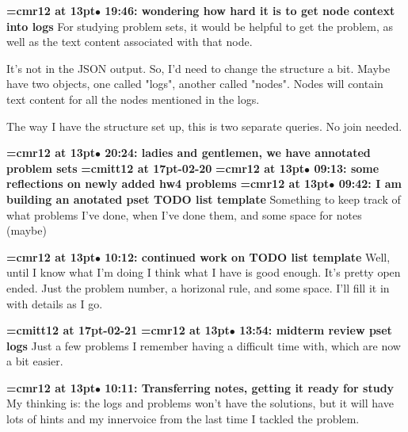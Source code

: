 {\smallskip\noindent\bf\font\titlefont=cmr12 at 13pt\titlefont $\bullet$ 19:46: wondering how hard it is to get node context into logs}\smallskip
For studying problem sets, it would be helpful to get the problem, as well as the text content associated with that node.
\par

It's not in the JSON output. So, I'd need to change the structure a bit. Maybe have two objects, one called "logs", another called "nodes". Nodes will contain text content for all the nodes mentioned in the logs.
\par

The way I have the structure set up, this is two separate queries. No join needed.
\par

{\smallskip\noindent\bf\font\titlefont=cmr12 at 13pt\titlefont $\bullet$ 20:24: ladies and gentlemen, we have annotated problem sets}\smallskip
{\medskip\noindent\bf\font\titlefont=cmitt12 at 17pt-02-20}\medskip
{\smallskip\noindent\bf\font\titlefont=cmr12 at 13pt\titlefont $\bullet$ 09:13: some reflections on newly added hw4 problems}\smallskip
{\smallskip\noindent\bf\font\titlefont=cmr12 at 13pt\titlefont $\bullet$ 09:42: I am building an anotated pset TODO list template}\smallskip
Something to keep track of what problems I've done, when I've done them, and some space for notes (maybe)
\par

{\smallskip\noindent\bf\font\titlefont=cmr12 at 13pt\titlefont $\bullet$ 10:12: continued work on TODO list template}\smallskip
Well, until I know what I'm doing I think what I have is good enough. It's pretty open ended. Just the problem number, a horizonal rule, and some space. I'll fill it in with details as I go.
\par

{\medskip\noindent\bf\font\titlefont=cmitt12 at 17pt-02-21}\medskip
{\smallskip\noindent\bf\font\titlefont=cmr12 at 13pt\titlefont $\bullet$ 13:54: midterm review pset logs}\smallskip
Just a few problems I remember having a difficult time with, which are now a bit easier.
\par

{\smallskip\noindent\bf\font\titlefont=cmr12 at 13pt\titlefont $\bullet$ 10:11: Transferring notes, getting it ready for study}\smallskip
My thinking is: the logs and problems won't have the solutions, but it will have lots of hints and my innervoice from the last time I tackled the problem.
\par

